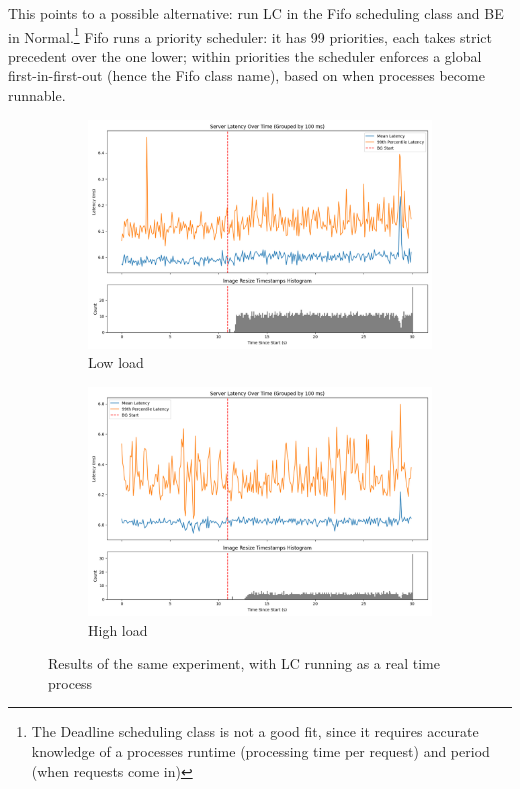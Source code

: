 This points to a possible alternative: run LC in the Fifo scheduling class and BE
in Normal.\footnote{The Deadline scheduling class is not a good fit, since it
requires accurate knowledge of a processes runtime (processing time per request)
and period (when requests come in)} Fifo runs a priority scheduler: it has 99
priorities, each takes strict precedent over the one lower; within priorities
the scheduler enforces a global first-in-first-out (hence the Fifo class name),
based on when processes become runnable.

\begin{figure}[t]
    \centering
    \begin{subfigure}[t]{0.48\columnwidth}
        \includegraphics[width=\columnwidth]{graphs/srv-bg-rt-low.png}
        \caption{Low load}\label{fig:srv-bg-rt-low}
    \end{subfigure}
    \hspace{\fill}
    \begin{subfigure}[t]{0.48\columnwidth}
        \includegraphics[width=\columnwidth]{graphs/srv-bg-rt-high.png}
        \caption{High load}\label{fig:srv-bg-rt-high}
    \end{subfigure}
    \vspace{4pt}
    \caption{Results of the same experiment, with LC running as a real time process}\label{fig:srv-bg-rt}
\end{figure}

